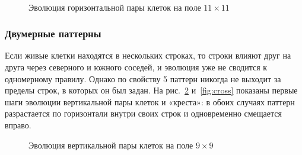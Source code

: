 \begin{figure}[H]
	\centering
	\begin{minipage}{0.3\textwidth}\centering{}\end{minipage}
	\begin{minipage}{0.3\textwidth}\centering{}\end{minipage}
	\begin{minipage}{0.3\textwidth}\centering{}\end{minipage}\\[3mm]
	\begin{minipage}{0.3\textwidth}\centering{}\end{minipage}
	\begin{minipage}{0.3\textwidth}\centering{}\end{minipage}
	\caption{Эволюция горизонтальной пары клеток на поле $11 \times 11$}
	\label{fig:hpair}
\end{figure}

\subsubsection*{Двумерные паттерны}

Если живые клетки находятся в нескольких строках, то строки влияют друг на друга через северного и южного соседей, и эволюция уже не сводится к одномерному правилу. Однако по свойству 5 паттерн никогда не выходит за пределы строк, в которых он был задан. На рис.~\ref{fig:vpair} и~\ref{fig:cross} показаны первые шаги эволюции вертикальной пары клеток и «креста»: в обоих случаях паттерн разрастается по горизонтали внутри своих строк и одновременно смещается вправо.

\begin{figure}[H]
	\centering
	\begin{minipage}{0.23\textwidth}\centering{}\end{minipage}
	\begin{minipage}{0.23\textwidth}\centering{}\end{minipage}
	\begin{minipage}{0.23\textwidth}\centering{}\end{minipage}
	\begin{minipage}{0.23\textwidth}\centering{}\end{minipage}
	\caption{Эволюция вертикальной пары клеток на поле $9 \times 9$}
	\label{fig:vpair}
\end{figure}

